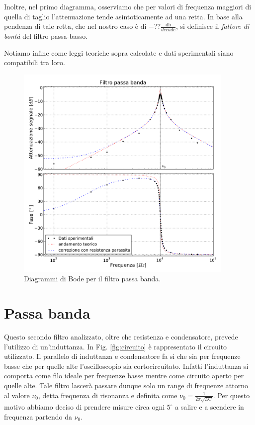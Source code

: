 Inoltre, nel primo diagramma, osserviamo che per valori di frequenza maggiori di quella di taglio l'attenuazione tende asintoticamente ad una retta. In base alla pendenza di tale retta, che nel nostro caso è di $-\textbf{??}\frac{\si{\decibel}}{decade}$, si definisce il \emph{fattore di bontà} del filtro passa-basso.

Notiamo infine come leggi teoriche sopra calcolate e dati sperimentali siano compatibili tra loro.
%
\begin{figure}
    \includegraphics[width=105mm]{bpf.pdf}
    \caption{Diagrammi di Bode per il filtro passa banda.}
    \label{fig:bpf}
\end{figure}

\section{Passa banda}
Questo secondo filtro analizzato, oltre che resistenza e condensatore, prevede l'utilizzo di un'induttanza. In Fig. \ref{fig:circuito} è rappresentato il circuito utilizzato. Il parallelo di induttanza e condensatore fa si che sia per frequenze basse che per quelle alte l'oscilloscopio sia cortocircuitato. Infatti l'induttanza si comporta come filo ideale per frequenze basse mentre come circuito aperto per quelle alte. Tale filtro lascerà passare dunque solo un range di frequenze attorno al valore $\nu_0$, detta frequenza di risonanza e definita come $\nu_0=\frac{1}{2 \pi \sqrt{LC}}$. Per questo motivo abbiamo deciso di prendere misure circa ogni $5^\circ$ a salire e a scendere in frequenza partendo da $\nu_0$.

